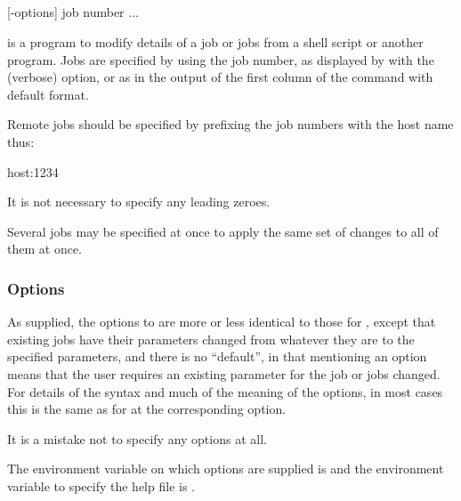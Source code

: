 \subsection{\BtjchangeName}

\begin{expara}

\BtjchangeName{} [-options] job number ...

\end{expara}

\PrBtjchange{} is a program to modify details of a job or jobs from a shell script or another program. Jobs are specified by
using the job number, as displayed by \PrBtr{} with the  (verbose) option, or as in the output of the first column of the \PrBtjlist{} command with default format.

Remote jobs should be specified by prefixing the job numbers with the host name thus:

\begin{expara}

host:1234

\end{expara}

It is not necessary to specify any leading zeroes.

Several jobs may be specified at once to apply the same set of changes to all of them at once.

\subsubsection{Options}
As supplied, the options to \BtjchangeName{} are more or less identical to those for \PrBtr{}, except that existing jobs have
their parameters changed from whatever they are to the specified parameters, and there is no ``default'', in
that mentioning an option means that the user requires an existing parameter for the job or jobs changed. For details of the syntax and
much of the meaning of the options, in most cases this is the same as for \PrBtr{} at the corresponding option.

It is a mistake not to specify any options at all.

The environment variable on which options are supplied is \filename{\BtjchangeVarname} and the environment variable to specify
the help file is .

\explainopt



